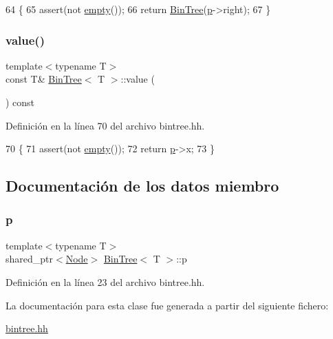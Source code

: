 \begin{DoxyCode}
64                            \{
65         assert(not \hyperlink{class_bin_tree_a74cda259ba5c25b8ee38ed4dc33e4fad}{empty}());
66         \textcolor{keywordflow}{return} \hyperlink{class_bin_tree_a47eef22d29cd023449d97c073c08e5b6}{BinTree}(\hyperlink{class_bin_tree_afe3647af1dda90f6ddf1deee6560fcf1}{p}->right);
67     \}
\end{DoxyCode}
\mbox{\label{class_bin_tree_a734e785b089c87b49187ee7c58edf5f3}} 
\subsubsection{\texorpdfstring{value()}{value()}}
{\footnotesize\ttfamily template$<$typename T$>$ \\
const T\& \hyperlink{class_bin_tree}{Bin\+Tree}$<$ T $>$\+::value (\begin{DoxyParamCaption}{ }\end{DoxyParamCaption}) const}



Definición en la línea 70 del archivo bintree.\+hh.


\begin{DoxyCode}
70                             \{
71         assert(not \hyperlink{class_bin_tree_a74cda259ba5c25b8ee38ed4dc33e4fad}{empty}());
72         \textcolor{keywordflow}{return} \hyperlink{class_bin_tree_afe3647af1dda90f6ddf1deee6560fcf1}{p}->x;
73     \}
\end{DoxyCode}


\subsection{Documentación de los datos miembro}
\mbox{\label{class_bin_tree_afe3647af1dda90f6ddf1deee6560fcf1}} 
\subsubsection{\texorpdfstring{p}{p}}
{\footnotesize\ttfamily template$<$typename T$>$ \\
shared\+\_\+ptr$<$\hyperlink{struct_bin_tree_1_1_node}{Node}$>$ \hyperlink{class_bin_tree}{Bin\+Tree}$<$ T $>$\+::p\hspace{0.3cm}{\ttfamily [private]}}



Definición en la línea 23 del archivo bintree.\+hh.



La documentación para esta clase fue generada a partir del siguiente fichero\+:\begin{DoxyCompactItemize}
\item 
\hyperlink{bintree_8hh}{bintree.\+hh}\end{DoxyCompactItemize}
